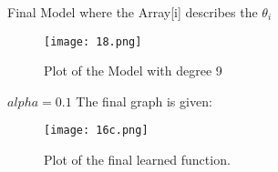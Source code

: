 \documentclass[11pt]{article}
\begin{document}
Final Model where the Array[i] describes  the $\theta_i$
\begin{figure}[ht]
    \centering
    \texttt{[image: 18.png]}
    \caption{Plot of the Model with degree 9}
    \label{18plot}
\end{figure}

$alpha = 0.1$
The final graph is given:
\begin{figure}[ht]
      \centering
      \texttt{[image: 16c.png]}
      \caption{Plot of the final learned function.}
  \end{figure}
\end{document}
